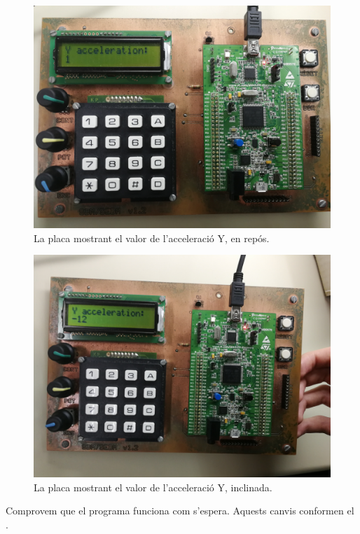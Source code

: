 \begin{figure}[p] %
  \begin{center}
    \includegraphics[width=.82\columnwidth]{../photos/board/p3-reading-initial_2}
  \end{center}
  \caption{ \label{fig:p3-board-reading-initial} La placa mostrant el valor de l'acceleració Y, en repós. }
\end{figure}
\begin{figure}[p]
  \begin{center}
    \includegraphics[width=.82\columnwidth]{../photos/board/p3-reading-tilt_2}
  \end{center}
  \caption{ \label{fig:p3-board-reading-tilt} La placa mostrant el valor de l'acceleració Y, inclinada. }
\end{figure}

Comprovem que el programa funciona com s'espera. Aquests canvis conformen el
.


